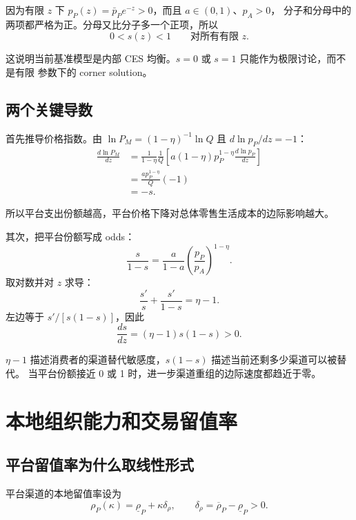 \documentclass[UTF8,11pt,scheme=chinese,fontset=fandol]{ctexart}
\theoremstyle{definition}
\begin{document}
因为有限 \(z\) 下 \(p_P(z)=\bar p_Pe^{-z}>0\)，而且 \(a\in(0,1)\)、\(p_A>0\)，
分子和分母中的两项都严格为正。分母又比分子多一个正项，所以
\begin{equation}
0<s(z)<1
\qquad\text{对所有有限 }z.
\end{equation}

这说明当前基准模型是内部 CES 均衡。\(s=0\) 或 \(s=1\) 只能作为极限讨论，而不是有限
参数下的 corner solution。

\subsection{两个关键导数}

首先推导价格指数。由 \(\ln P_M=(1-\eta)^{-1}\ln Q\) 且
\(d\ln p_P/dz=-1\)：
\begin{align}
\frac{d\ln P_M}{dz}
&=\frac{1}{1-\eta}\frac{1}{Q}
\left[a(1-\eta)p_P^{1-\eta}\frac{d\ln p_P}{dz}\right]\\
&=\frac{ap_P^{1-\eta}}{Q}(-1)\\
&=-s.
\label{teach:eq:dprice}
\end{align}

所以平台支出份额越高，平台价格下降对总体零售生活成本的边际影响越大。

其次，把平台份额写成 odds：
\[
\frac{s}{1-s}
=\frac{a}{1-a}\left(\frac{p_P}{p_A}\right)^{1-\eta}.
\]
取对数并对 \(z\) 求导：
\[
\frac{s'}{s}+\frac{s'}{1-s}=\eta-1.
\]
左边等于 \(s'/[s(1-s)]\)，因此
\begin{equation}
\frac{ds}{dz}=(\eta-1)s(1-s)>0.
\label{teach:eq:dshare}
\end{equation}

\(\eta-1\) 描述消费者的渠道替代敏感度，\(s(1-s)\) 描述当前还剩多少渠道可以被替代。
当平台份额接近 0 或 1 时，进一步渠道重组的边际速度都趋近于零。

\section{本地组织能力和交易留值率}

\subsection{平台留值率为什么取线性形式}

平台渠道的本地留值率设为
\begin{equation}
\rho_P(\kappa)=\underline\rho_P+\kappa\delta_\rho,
\qquad
\delta_\rho=\overline\rho_P-\underline\rho_P>0.
\label{teach:eq:rhop}
\end{equation}
\end{document}
